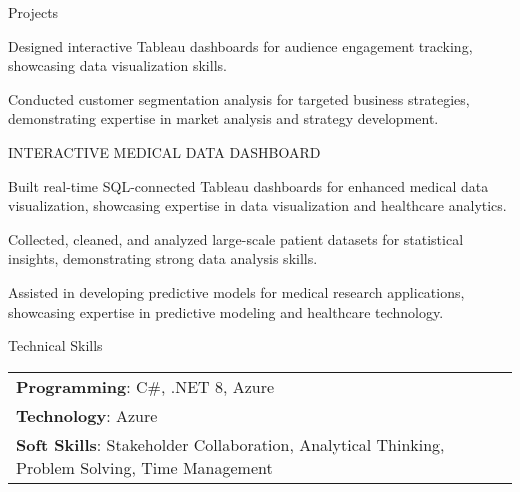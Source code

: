 \documentclass{resume} %
\begin{document}
\begin{rSection}{Projects}
\begin{rSubsection}
                                    \item Designed interactive Tableau dashboards for audience engagement tracking, showcasing data visualization skills.
                                    \item Conducted customer segmentation analysis for targeted business strategies, demonstrating expertise in market analysis and strategy development.
                            \end{rSubsection}
                    \begin{rSubsection}
                                    {INTERACTIVE MEDICAL DATA DASHBOARD}
                                {}{}{}
                                    \item Built real{-}time SQL{-}connected Tableau dashboards for enhanced medical data visualization, showcasing expertise in data visualization and healthcare analytics.
                                    \item Collected, cleaned, and analyzed large{-}scale patient datasets for statistical insights, demonstrating strong data analysis skills.
                                    \item Assisted in developing predictive models for medical research applications, showcasing expertise in predictive modeling and healthcare technology.
                            \end{rSubsection}
            \end{rSection}

    \begin{rSection}{Technical Skills}
        \begin{tabular}{ @{} l @{	} l }
                                \textbf{Programming}: C\#, .NET 8, Azure\\
                                \textbf{Technology}: Azure\\
                                \textbf{Soft Skills}: Stakeholder Collaboration, Analytical Thinking, Problem Solving, Time Management\\
        \end{tabular}
    \end{rSection}
\end{document}

